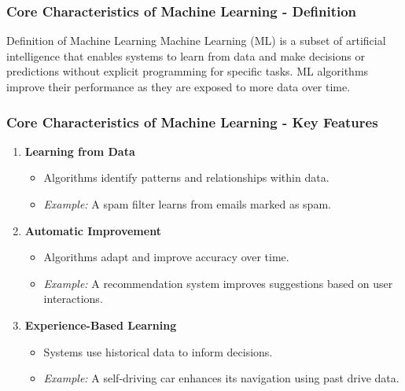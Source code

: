 \documentclass[aspectratio=169]{beamer}
\begin{document}
\begin{frame}[fragile]
    \frametitle{Core Characteristics of Machine Learning - Definition}
    \begin{block}{Definition of Machine Learning}
        Machine Learning (ML) is a subset of artificial intelligence that enables systems to learn from data and make decisions or predictions without explicit programming for specific tasks. ML algorithms improve their performance as they are exposed to more data over time.
    \end{block}
\end{frame}

\begin{frame}[fragile]
    \frametitle{Core Characteristics of Machine Learning - Key Features}
    \begin{enumerate}
        \item \textbf{Learning from Data}
            \begin{itemize}
                \item Algorithms identify patterns and relationships within data.
                \item \textit{Example:} A spam filter learns from emails marked as spam.
            \end{itemize}
        
        \item \textbf{Automatic Improvement}
            \begin{itemize}
                \item Algorithms adapt and improve accuracy over time.
                \item \textit{Example:} A recommendation system improves suggestions based on user interactions.
            \end{itemize}
        
        \item \textbf{Experience-Based Learning}
            \begin{itemize}
                \item Systems use historical data to inform decisions.
                \item \textit{Example:} A self-driving car enhances its navigation using past drive data.
            \end{itemize}
    \end{enumerate}
\end{frame}
\end{document}
